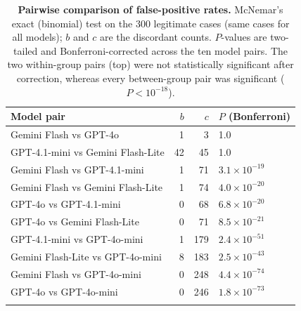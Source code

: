 \documentclass[pdflatex,sn-basic,Numbered]{sn-jnl}
\begin{document}
\begin{table}[t]
\caption{\textbf{Pairwise comparison of false-positive rates.} McNemar's exact (binomial) test on the 300 legitimate cases (same cases for all models); $b$ and $c$ are the discordant counts. $P$-values are two-tailed and Bonferroni-corrected across the ten model pairs. The two within-group pairs (top) were not statistically significant after correction, whereas every between-group pair was significant ($P<10^{-18}$).}\label{tab:mcnemar}
\begin{tabular}{@{}lrrl@{}}
\toprule
Model pair & $b$ & $c$ & $P$ (Bonferroni) \\
\midrule
Gemini Flash vs GPT-4o                & 1 & 3   & 1.0 \\
GPT-4.1-mini vs Gemini Flash-Lite     & 42 & 45 & 1.0 \\
Gemini Flash vs GPT-4.1-mini          & 1 & 71  & $3.1\times10^{-19}$ \\
Gemini Flash vs Gemini Flash-Lite     & 1 & 74  & $4.0\times10^{-20}$ \\
GPT-4o vs GPT-4.1-mini                 & 0 & 68  & $6.8\times10^{-20}$ \\
GPT-4o vs Gemini Flash-Lite            & 0 & 71  & $8.5\times10^{-21}$ \\
GPT-4.1-mini vs GPT-4o-mini            & 1 & 179 & $2.4\times10^{-51}$ \\
Gemini Flash-Lite vs GPT-4o-mini       & 8 & 183 & $2.5\times10^{-43}$ \\
Gemini Flash vs GPT-4o-mini            & 0 & 248 & $4.4\times10^{-74}$ \\
GPT-4o vs GPT-4o-mini                  & 0 & 246 & $1.8\times10^{-73}$ \\
\botrule
\end{tabular}
\end{table}
\end{document}

